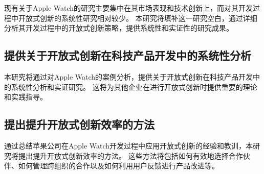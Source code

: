 现有关于Apple Watch的研究主要集中在其市场表现和技术创新上，而对其开发过程中开放式创新的系统性研究相对较少。
本研究将填补这一研究空白，通过详细分析其开发过程中的开放式创新策略，提供系统性和实证性的研究成果\citep{apple2024,davidson_assessing_2023}。

\subsection{提供关于开放式创新在科技产品开发中的系统性分析}

本研究将通过对Apple Watch的案例分析，提供关于开放式创新在科技产品开发中的系统性分析和实证研究。
这将为其他企业在进行开放式创新时提供重要的理论和实践指导\citep{gehani2016corporate, dahlander_how_2010}。

\subsection{提出提升开放式创新效率的方法}

通过总结苹果公司在Apple Watch开发过程中应用开放式创新的经验和教训，本研究将提出提升开放式创新效率的方法。
这些方法将包括如何有效地选择合作伙伴、如何管理跨组织的合作以及如何利用用户反馈进行产品改进等\citep{chesbrough_beyond_2006, chesbrough2016}。
